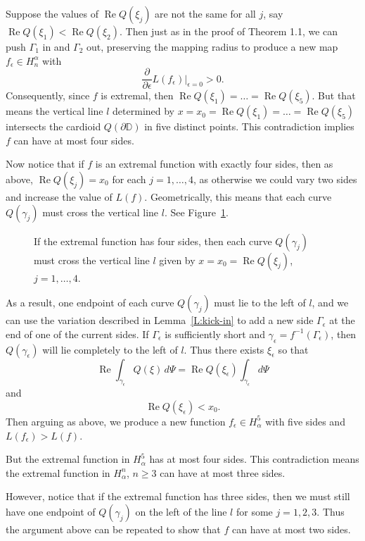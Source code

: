 \documentclass{cmft}
\newcommand{\D}{\mathbb{D}}
\newcommand{\e}{\epsilon}
\newcommand{\al}{\alpha}
\DeclareMathOperator{\re}{Re}
\begin{document}
Suppose the values of $\re Q(\xi_j)$ are not the same for all $j$, say
$\re Q(\xi_1) <\re Q(\xi_2)$.
 Then just as in the proof of Theorem 1.1, we can push $\Gamma_1$
in and $\Gamma_2$ out, preserving the mapping radius to produce a new map
$f_\epsilon\in H_n^\al$ with 
\[
\frac{\partial}{\partial \epsilon} L(f_\epsilon)\biggr \vert_{\epsilon=0} >0.
\]
Consequently, since $f$ is extremal, then $\re Q(\xi_1)=\dots= \re Q(\xi_5)$.
But that means the vertical line $l$ determined by 
$x=x_0=\re Q(\xi_1)=\dots= \re Q(\xi_5)$ intersects the cardioid 
$Q(\partial\D)$ in five distinct points.  This contradiction
implies $f$ can have at most four sides.

Now notice that if $f$ is an extremal function with exactly four sides, then
as above,  
$\re Q(\xi_j)=x_0$ for each $j=1,\dots,4$, as otherwise we could vary two  sides
and increase the value of $L(f)$.  Geometrically, this means that
each curve $Q(\gamma_j)$ must cross the vertical line $l$.  
See Figure~\ref{F:4-sides}.



\begin{figure}
\begin{center}
\caption{If the extremal function has four sides, then each curve $Q(\gamma_j)$
  must cross the vertical line $l$  given by $x=x_0=\re Q(\xi_j)$, $j=1,\dots,4$.}
\label{F:4-sides}
\end{center}
\end{figure}

As a result, one endpoint of each curve $Q(\gamma_j)$ must lie to the left
of $l$, 
and we can use the variation described in Lemma~\ref{L:kick-in}
to add a new side $\Gamma_\epsilon$ at the end of one of the current sides.
  If $\Gamma_\epsilon$ is sufficiently short and $\gamma_\epsilon
=f^{-1}(\Gamma_\e)$,
then  $Q(\gamma_\e)$ will lie
completely to the left of $l$.  Thus there exists $\xi_\e$ so that
\[
\re \int_{\gamma_\e} Q(\xi)\,d\Psi =\re Q(\xi_\e) \int_{\gamma_\e} d\Psi
\]
and
\[
\re Q(\xi_\e)<x_0. 
\]
Then arguing as above, we
produce a new function $f_\epsilon \in H_\al^5$ with five sides and
$L(f_\epsilon)>L(f)$.

But the extremal function in $H_\al^5$ has at most four sides.  This
contradiction means the extremal function in $H_\al^n$, $n\ge 3$ can
have at most three sides.

However, notice that if the extremal function has three sides, then
we must still have 
one endpoint of $Q(\gamma_j)$ on the left of the line $l$ for some $j=1,2,3$.
Thus the argument above can be repeated to show that $f$ can have at
most two sides.  
\end{document}
